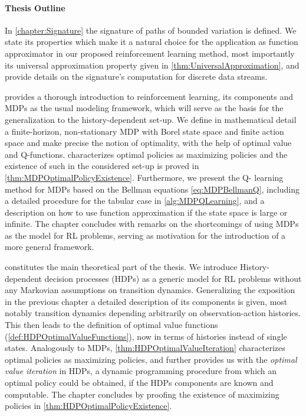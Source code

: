 \documentclass[
    a4paper,
    11pt,
    bibliography=totoc,
    listof=totoc,      
    headinclude=true,
    cleardoublepage=empty,
]{scrbook}
\theoremstyle{plain}
\theoremstyle{definition}
\theoremstyle{remark}
\begin{document}
\paragraph{Thesis Outline}
\label{chapter:Introduction:par:ThesisOutline}

In \cref{chapter:Signature} the signature of paths of bounded variation is 
defined. We state its properties which make it a natural choice for the 
application as function approximator in our proposed reinforcement learning 
method, most importantly its universal approximation property given in 
\cref{thm:UniversalApproximation}, and provide details on the signature's
computation for discrete data streams.

 provides a thorough introduction to reinforcement 
learning, its components and MDPs as the usual modeling framework, which will 
serve as the basis for the generalization to the history-dependent set-up. 
We define in mathematical detail a finite-horizon, non-stationary MDP with 
Borel state space and finite action space and make precise the notion 
of optimality, with the help of optimal value and Q-functions. 
 characterizes optimal policies as 
maximizing policies and the existence of such in the considered set-up is 
proved in \cref{thm:MDPOptimalPolicyExistence}. Furthermore, we present the Q-%
learning method for MDPs based on the Bellman equations \eqref{eq:MDPBellmanQ}, 
including a detailed procedure for the tabular case in 
\cref{alg:MDPQLearning}, and a description on how to use function approximation 
if the state space is large or infinite. The chapter concludes with remarks on 
the shortcomings of using MDPs as the model for RL problems, serving as 
motivation for the introduction of a more general framework.

 constitutes the main theoretical part of 
the thesis. We introduce History-dependent decision processes (HDPs) as a 
generic model for RL problems without any Markovian assumptions on transition 
dynamics. Generalizing the exposition in the previous chapter a 
detailed description of its components is given, most notably transition 
dynamics depending arbitrarily on observation-action histories. This then 
leads to the definition of optimal value functions 
(\cref{def:HDPOptimalValueFunctions}), now in terms of histories instead of 
single states. Analogously to MDPs, \cref{thm:HDPOptimalValueIteration} 
characterizes optimal policies as maximizing policies, and further provides us 
with the \textit{optimal value iteration} in HDPs, a dynamic programming 
procedure from which an optimal policy could be obtained, if the HDPs 
components are known and computable. The chapter concludes by proofing the 
existence of maximizing policies in \cref{thm:HDPOptimalPolicyExistence}.
\end{document}
